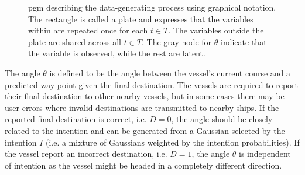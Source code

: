 \begin{figure}[h]
    \centering
    \caption{\acrshort{pgm} describing the data-generating process using graphical notation. The rectangle is called a plate and expresses that the variables within are repeated once for each $t \in T$. The variables outside the plate are shared across all $t \in T$. The gray node for $\theta$ indicate that the variable is observed, while the rest are latent.}
    \label{fig:example_pgm}
\end{figure}

The angle $\theta$ is defined to be the angle between the vessel's current course and a predicted way-point given the final destination. The vessels are required to report their final destination to other nearby vessels, but in some cases there may be user-errors where invalid destinations are transmitted to nearby ships. If the reported final destination is correct, i.e. $D=0$, the angle should be closely related to the intention and can be generated from a Gaussian selected by the intention $I$ (i.e. a mixture of Gaussians weighted by the intention probabilities). If the vessel report an incorrect destination, i.e. $D=1$, the angle $\theta$ is independent of intention as the vessel might be headed in a completely different direction.

